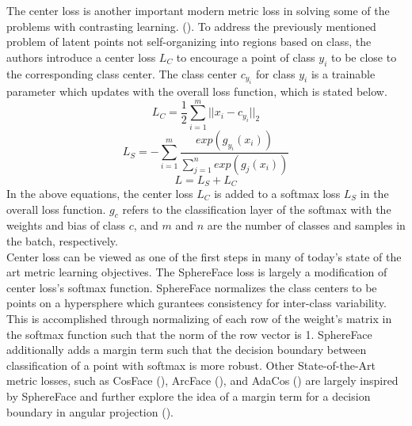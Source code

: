 \documentclass[./dissertation.tex]{subfiles}
\begin{document}
    The center loss is another important modern metric loss in solving some of the problems with contrasting learning. (\cite{10.1007/978-3-319-46478-7_31}). To address the previously mentioned problem of latent points not self-organizing into regions based on class, the authors introduce a center loss $L_{C}$ to encourage a point of class $y_{i}$ to be close to the corresponding class center. The class center $c_{y_{i}}$ for class $y_{i}$ is a trainable parameter which updates with the overall loss function, which is stated below.
    \begin{equation*}
    L_{C} = \frac{1}{2}\sum_{i = 1}^{m}||x_{i} - c_{y_{i}}||_{2} \end{equation*}
    \begin{equation*}
    L_{S} = - \sum_{i = 1}^{m}\frac{exp(g_{y_{i}}(x_{i}))}{\sum_{j = 1}^{n}exp(g_{j}(x_{i}))} 
    \end{equation*}
    \begin{equation*}
    L = L_{S} + L_{C}
    \end{equation*}
    In the above equations, the center loss $L_{C}$ is added to a softmax loss $L_{S}$ in the overall loss function. $g_{c}$ refers to the classification layer of the softmax with the weights and bias of class $c$, and $m$ and $n$ are the number of classes and samples in the batch, respectively. \\
    
    Center loss can be viewed as one of the first steps in many of today's state of the art metric learning objectives. The SphereFace loss \cite{liu2017sphereface} is largely a modification of center loss's softmax function. SphereFace normalizes the class centers to be points on a hypersphere which gurantees consistency for inter-class variability. This is accomplished through normalizing of each row of the weight's matrix in the softmax function such that the norm of the row vector is 1. SphereFace additionally adds a margin term such that the decision boundary between classification of a point with softmax is more robust.  Other State-of-the-Art metric losses, such as CosFace (\cite{wang2018cosface}), ArcFace (\cite{deng2019arcface}), and AdaCos (\cite{zhang2019adacos}) are largely inspired by SphereFace and further explore the idea of a margin term for a decision boundary in angular projection (\cite{hav4ik2021deepmetriclearning}). 
\end{document}
